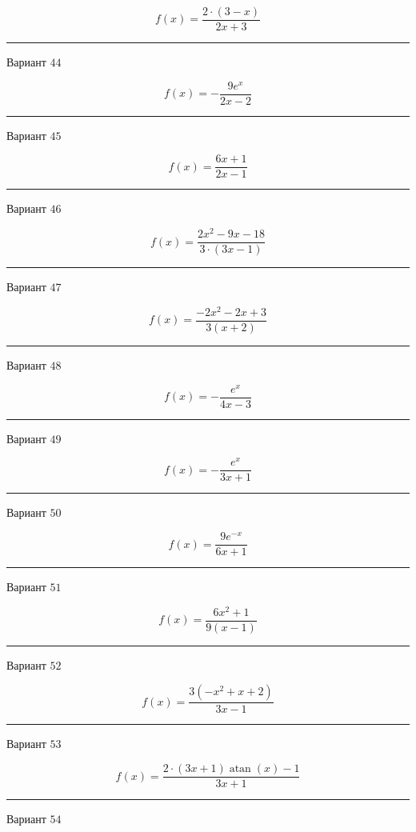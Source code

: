 \documentclass[11pt]{report}
\begin{document}
$$f(x) = \frac{2 \cdot \left(3 - x\right)}{2 x + 3}$$
\begin{center}
\noindent\rule{8cm}{0.4pt}
\end{center}
Вариант $44$


$$f(x) = - \frac{9 e^{x}}{2 x - 2}$$
\begin{center}
\noindent\rule{8cm}{0.4pt}
\end{center}
Вариант $45$


$$f(x) = \frac{6 x + 1}{2 x - 1}$$
\begin{center}
\noindent\rule{8cm}{0.4pt}
\end{center}
Вариант $46$


$$f(x) = \frac{2 x^{2} - 9 x - 18}{3 \cdot \left(3 x - 1\right)}$$
\begin{center}
\noindent\rule{8cm}{0.4pt}
\end{center}
Вариант $47$


$$f(x) = \frac{- 2 x^{2} - 2 x + 3}{3 \left(x + 2\right)}$$
\begin{center}
\noindent\rule{8cm}{0.4pt}
\end{center}
Вариант $48$


$$f(x) = - \frac{e^{x}}{4 x - 3}$$
\begin{center}
\noindent\rule{8cm}{0.4pt}
\end{center}
Вариант $49$


$$f(x) = - \frac{e^{x}}{3 x + 1}$$
\begin{center}
\noindent\rule{8cm}{0.4pt}
\end{center}
Вариант $50$


$$f(x) = \frac{9 e^{- x}}{6 x + 1}$$
\begin{center}
\noindent\rule{8cm}{0.4pt}
\end{center}
Вариант $51$


$$f(x) = \frac{6 x^{2} + 1}{9 \left(x - 1\right)}$$
\begin{center}
\noindent\rule{8cm}{0.4pt}
\end{center}
Вариант $52$


$$f(x) = \frac{3 \left(- x^{2} + x + 2\right)}{3 x - 1}$$
\begin{center}
\noindent\rule{8cm}{0.4pt}
\end{center}
Вариант $53$


$$f(x) = \frac{2 \cdot \left(3 x + 1\right) \operatorname{atan}{\left(x \right)} - 1}{3 x + 1}$$
\begin{center}
\noindent\rule{8cm}{0.4pt}
\end{center}
Вариант $54$
\end{document}
